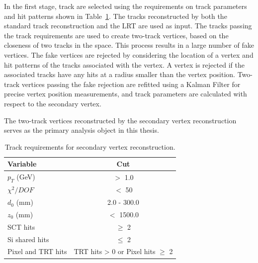 In the first stage, track are selected using the requirements on track parameters and hit patterns shown in Table~\ref{table:vertex_track_selection_simple}. The tracks reconstructed by both the standard track reconstruction and the LRT are used as input. The tracks passing the track requirements are used to create two-track vertices, based on the closeness of two tracks in the space. This process results in a large number of fake vertices. The fake vertices are rejected by considering the location of a vertex and hit patterns of the tracks associated with the vertex. A vertex is rejected if the associated tracks have any hits at a radius smaller than the vertex position. Two-track vertices passing the fake rejection are refitted using a Kalman Filter for precise vertex position measurements, and track parameters are calculated with respect to the secondary vertex.

The two-track vertices reconstructed by the secondary vertex reconstruction serves as the primary analysis object in this thesis. %







\begin{table}[!htb]
  \centering
  \begin{tabular}{ l c }
    \hline
    \hline
	Variable      		& Cut                                         	\\
    \hline
	$p_{T}$ (GeV)		& $>$ 1.0										\\
	$\chi^{2} / DOF$	& $<$ 50  										\\
	$d_{0}$	(mm)		& 2.0 - 300.0									\\
	$z_{0}$ (mm)		& $<$ 1500.0									\\
	SCT hits			& $\geq$ 2										\\
	Si shared hits	    & $\leq$ 2										\\
	Pixel and TRT hits  & TRT hits > 0 or Pixel hits $\geq$ 2			\\
    \hline
    \hline
  \end{tabular}
  \caption{Track requirements for secondary vertex reconstruction.}
  \label{table:vertex_track_selection_simple}
\end{table}



